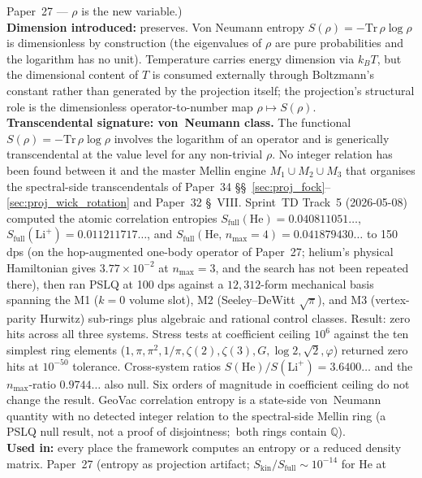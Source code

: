 \documentclass[11pt]{article}
\begin{document}
Paper~27 --- $\rho$ is the new variable.)\\
\textbf{Dimension introduced:} preserves.  Von Neumann entropy
$S(\rho) = -\mathrm{Tr}\,\rho\log\rho$ is dimensionless by
construction (the eigenvalues of $\rho$ are pure probabilities and the
logarithm has no unit).  Temperature carries energy dimension via
$k_B T$, but the dimensional content of $T$ is consumed externally
through Boltzmann's constant rather than generated by the projection
itself; the projection's structural role is the dimensionless
operator-to-number map $\rho \mapsto S(\rho)$.\\
\textbf{Transcendental signature: von~Neumann class.}  The functional
$S(\rho) = -\mathrm{Tr}\,\rho\log\rho$ involves the logarithm of an
operator and is generically transcendental at the value level for any
non-trivial $\rho$.  No integer relation has been found between it and
the master Mellin engine $M_1 \cup M_2 \cup M_3$ that organises the
spectral-side transcendentals of Paper~34
\S\S~\ref{sec:proj_fock}--\ref{sec:proj_wick_rotation} and Paper~32
\S~VIII.  Sprint~TD Track~5 (2026-05-08) computed the atomic
correlation entropies $S_\mathrm{full}(\mathrm{He}) =
0.040811051\ldots$, $S_\mathrm{full}(\mathrm{Li}^+) =
0.011211717\ldots$, and $S_\mathrm{full}(\mathrm{He},\, n_{\max}{=}4)
= 0.041879430\ldots$ to 150 dps (on the hop-augmented one-body
operator of Paper~27; helium's physical Hamiltonian gives
$3.77\times10^{-2}$ at $n_{\max}=3$, and the search has not been
repeated there), then ran PSLQ at 100 dps against a
$12{,}312$-form mechanical basis spanning the M1 ($k = 0$ volume slot),
M2 (Seeley--DeWitt $\sqrt{\pi}$), and M3 (vertex-parity Hurwitz)
sub-rings plus algebraic and rational control classes.  Result: zero
hits across all three systems.  Stress tests at coefficient ceiling
$10^6$ against the ten simplest ring elements ($1, \pi, \pi^2, 1/\pi,
\zeta(2), \zeta(3), G, \log 2, \sqrt{2}, \varphi$) returned zero hits
at $10^{-50}$ tolerance.  Cross-system ratios
$S(\mathrm{He})/S(\mathrm{Li}^+) = 3.6400\ldots$ and the
$n_{\max}$-ratio $0.9744\ldots$ also null.  Six orders of magnitude in
coefficient ceiling do not change the result.  GeoVac correlation
entropy is a state-side von~Neumann quantity with no
detected integer relation to the spectral-side Mellin ring (a PSLQ null
result, not a proof of disjointness;\ both rings contain $\mathbb{Q}$).\\
\textbf{Used in:} every place the framework computes an entropy or a
reduced density matrix.  Paper~27 (entropy as projection artifact;
$S_\mathrm{kin}/S_\mathrm{full} \sim 10^{-14}$ for He at
\end{document}
